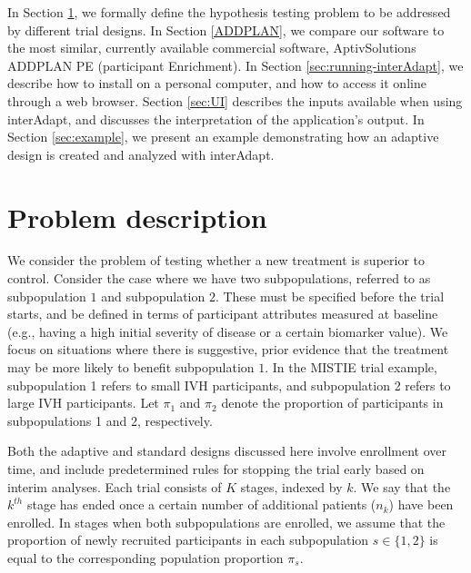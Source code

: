 \documentclass[article]{jss}
\begin{document}
In Section \ref{sec:problemDescription}, we  formally define the hypothesis testing problem to be addressed by different trial designs. In Section \ref{ADDPLAN}, we compare our software to the most similar, currently available commercial software, AptivSolutions ADDPLAN PE (participant Enrichment). 
In Section \ref{sec:running-interAdapt}, we describe how to install  on a personal computer, and how to access it online through a web browser. Section \ref{sec:UI} describes the inputs available when using \textsf{interAdapt}, and discusses the interpretation of the application's output. In Section \ref{sec:example}, we present an example demonstrating how an adaptive design is created and analyzed with \textsf{interAdapt}. 

\section{Problem description}
\label{sec:problemDescription}

We consider the problem of testing whether a new treatment is superior to control.
Consider the case where we have two subpopulations, referred to as subpopulation $1$ and subpopulation $2$. These must be specified before the trial starts, and be defined in terms of participant attributes measured at baseline (e.g., having a high initial severity of disease or a certain biomarker value). 
We focus on situations where  there is suggestive, prior evidence that the treatment may be more likely to benefit subpopulation $1$.
In the MISTIE trial example, subpopulation 1 refers to small IVH participants, and subpopulation 2 refers to large IVH participants.
Let $π_1$ and $π_2$ denote the proportion of participants in subpopulations 1 and 2, respectively. 


Both the adaptive and standard designs discussed here involve enrollment over time, and include predetermined rules for stopping the trial early based on interim analyses. Each trial consists of $K$ stages, indexed by $k$. We say that the $k^{th}$ stage has ended once a certain number of additional patients ($n_k$) have been enrolled. %
In stages when both subpopulations are enrolled, we assume that the proportion of newly recruited participants  in each subpopulation $s \in \{1,2\}$ is equal to the corresponding population proportion $\pi_s$. %
\end{document}
